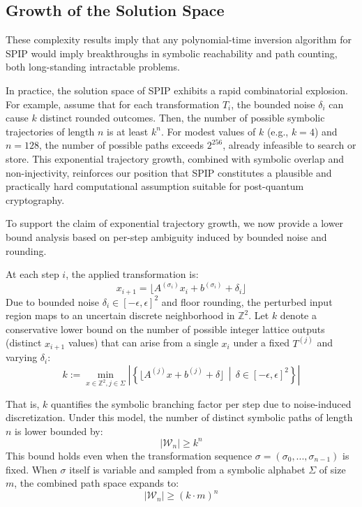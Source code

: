 \documentclass[twocolumn,10pt]{article}
\begin{document}
\subsection{Growth of the Solution Space}

These complexity results imply that any polynomial-time inversion algorithm for SPIP would imply breakthroughs in symbolic reachability and path counting, both long-standing intractable problems.

In practice, the solution space of SPIP exhibits a rapid combinatorial explosion. For example, assume that for each transformation $T_i$, the bounded noise $\delta_i$ can cause $k$ distinct rounded outcomes. Then, the number of possible symbolic trajectories of length $n$ is at least $k^n$. For modest values of $k$ (e.g., $k = 4$) and $n = 128$, the number of possible paths exceeds $2^{256}$, already infeasible to search or store.
This exponential trajectory growth, combined with symbolic overlap and non-injectivity, reinforces our position that SPIP constitutes a plausible and practically hard computational assumption suitable for post-quantum cryptography.

To support the claim of exponential trajectory growth, we now provide a lower bound analysis based on per-step ambiguity induced by bounded noise and rounding.

At each step $i$, the applied transformation is:
\[
x_{i+1} = \lfloor A^{(\sigma_i)} x_i + b^{(\sigma_i)} + \delta_i \rfloor
\]
Due to bounded noise $\delta_i \in [-\epsilon, \epsilon]^2$ and floor rounding, the perturbed input region maps to an uncertain discrete neighborhood in $\mathbb{Z}^2$. Let $k$ denote a conservative lower bound on the number of possible integer lattice outputs (distinct $x_{i+1}$ values) that can arise from a single $x_i$ under a fixed $T^{(j)}$ and varying $\delta_i$:
\[
k := \min_{x \in \mathbb{Z}^2, j \in \Sigma} \left|\left\{ \lfloor A^{(j)} x + b^{(j)} + \delta \rfloor \,\middle|\, \delta \in [-\epsilon, \epsilon]^2 \right\} \right|
\]

That is, $k$ quantifies the symbolic branching factor per step due to noise-induced discretization. Under this model, the number of distinct symbolic paths of length $n$ is lower bounded by:
\[
|\mathcal{W}_n| \geq k^n
\]
This bound holds even when the transformation sequence $\sigma = (\sigma_0, ..., \sigma_{n-1})$ is fixed. When $\sigma$ itself is variable and sampled from a symbolic alphabet $\Sigma$ of size $m$, the combined path space expands to:
\[
|\mathcal{W}_n| \geq (k \cdot m)^n
\]
\end{document}
